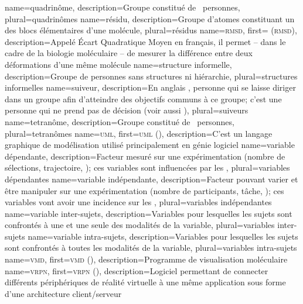 %
{%
	name={quadrinôme},%
	description={Groupe constitué de ~personnes},%
	plural={quadrinômes}%
}
%
{%
	name={résidu},%
	description={Groupe d'atomes constituant un des blocs élémentaires d'une molécule},%
	plural={résidus}%
}
%
{%
	name={\textsc{rmsd}},%
	first={ (\textsc{rmsd})},%
	description={Appelé Écart Quadratique Moyen en français, il permet -- dans le cadre de la biologie moléculaire -- de mesurer la différence entre deux déformations d'une même molécule}%
}
%
{%
	name={structure informelle},%
	description={Groupe de personnes sans structures ni hiérarchie},%
	plural={structures informelles}%
}
%
{%
	name={suiveur},%
	description={En anglais , personne qui se laisse diriger dans un groupe afin d'atteindre des objectifs communs à ce groupe; c'est une personne qui ne prend pas de décision (voir aussi )},%
	plural={suiveurs}%
}
%
{%
	name={tetranôme},%
	description={Groupe constitué de ~personnes},%
	plural={tetranômes}%
}
%
{%
	name={\textsc{uml}},%
	first={\textsc{uml} ()},%
	description={C'est un langage graphique de modélisation utilisé principalement en génie logiciel}%
}
%
{%
	name={variable dépendante},%
	description={Facteur mesuré sur une expérimentation (nombre de sélections, trajectoire, \myetc); ces variables sont influencées par les },%
	plural={variables dépendantes}%
}
%
{%
	name={variable indépendante},%
	description={Facteur pouvant varier et être manipuler sur une expérimentation (nombre de participants, tâche, \myetc); ces variables vont avoir une incidence sur les },%
	plural={variables indépendantes}%
}
%
{%
	name={variable inter-sujets},%
	description={Variables pour lesquelles les sujets sont confrontés à une et une seule des modalités de la variable},%
	plural={variables inter-sujets}%
}
%
{%
	name={variable intra-sujets},%
	description={Variables pour lesquelles les sujets sont confrontés à toutes les modalités de la variable},%
	plural={variables intra-sujets}%
}
%
{%
	name={\textsc{vmd}},%
	first={\textsc{vmd} ()},%
	description={Programme de visualisation moléculaire }%
}
%
{%
	name={\textsc{vrpn}},%
	first={\textsc{vrpn} ()},%
	description={Logiciel permettant de connecter différents périphériques de réalité virtuelle à une même application sous forme d'une architecture client/serveur }%
}
